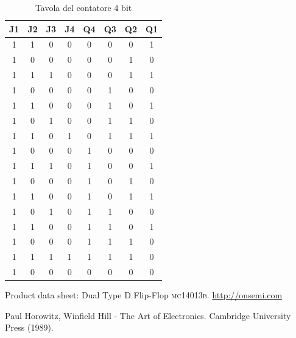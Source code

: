 \documentclass[journal, a4paper]{IEEEtran}
\begin{document}
\begin{table}
\centering
\caption{Tavola del contatore 4 bit}
\label{tab:count4}
\begin{tabular}{c|c|c|c|c|c|c|c}
\hline 
\textbf{J1} & \textbf{J2} & \textbf{J3} & \textbf{J4} & \textbf{Q4} & \textbf{Q3} & \textbf{Q2} & \textbf{Q1} \\ 
\hline 
1 & 1 & 0 & 0 & 0 & 0 & 0 & 1 \\ 

1 & 0 & 0 & 0 & 0 & 0 & 1 & 0 \\ 
 
1 & 1 & 1 & 0 & 0 & 0 & 1 & 1 \\ 
 
1 & 0 & 0 & 0 & 0 & 1 & 0 & 0 \\ 
 
1 & 1 & 0 & 0 & 0 & 1 & 0 & 1 \\ 
 
1 & 0 & 1 & 0 & 0 & 1 & 1 & 0 \\ 

1 & 1 & 0 & 1 & 0 & 1 & 1 & 1 \\ 

1 & 0 & 0 & 0 & 1 & 0 & 0 & 0 \\ 

1 & 1 & 1 & 0 & 1 & 0 & 0 & 1 \\ 

1 & 0 & 0 & 0 & 1 & 0 & 1 & 0 \\ 

1 & 1 & 0 & 0 & 1 & 0 & 1 & 1 \\ 
 
1 & 0 & 1 & 0 & 1 & 1 & 0 & 0 \\ 

1 & 1 & 0 & 0 & 1 & 1 & 0 & 1 \\ 
 
1 & 0 & 0 & 0 & 1 & 1 & 1 & 0 \\ 
 
1 & 1 & 1 & 1 & 1 & 1 & 1 & 0 \\ 

1 & 0 & 0 & 0 & 0 & 0 & 0 & 0 \\ 
\hline 
\end{tabular}
\end{table}


\begin{thebibliography}{5}

	
	Product data sheet: Dual Type D Flip-Flop \textsc{mc14013b}.
	\url{http://onsemi.com}

	Paul Horowitz, Winfield Hill - The Art of Electronics. Cambridge University Press (1989).
	
\end{thebibliography}
\end{document}
